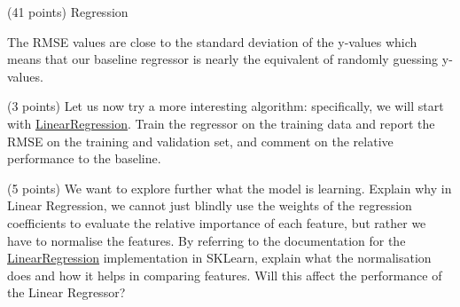 \documentclass[12pt]{article}
\begin{document}
\begin{question}{\label{Q_LR_BA}(41 points) Regression}
\begin{subquestion}
{The RMSE values are close to the standard deviation of the y-values which means that our baseline regressor is nearly the equivalent of randomly guessing y-values.
}



\end{subquestion}

\begin{subquestion}{(3 points) Let us now try a more interesting algorithm: specifically, we will start with \href{https://scikit-learn.org/stable/modules/generated/sklearn.linear_model.LinearRegression.html}{LinearRegression}. Train the regressor on the training data and report the RMSE on the training and validation set, and comment on the relative performance to the baseline.}






\end{subquestion}



\begin{subquestion}{(5 points) We want to explore further what the model is learning. Explain why in Linear Regression, we cannot just blindly use the weights of the regression coefficients to evaluate the relative importance of each feature, but rather we have to normalise the features. By referring to the documentation for the \href{http://scikit-learn.org/stable/modules/generated/sklearn.linear_model.LinearRegression.html}{LinearRegression} implementation in SKLearn, explain what the normalisation does and how it helps in comparing features. Will this affect the performance of the Linear Regressor?}







\end{subquestion}
\end{question}
\end{document}
